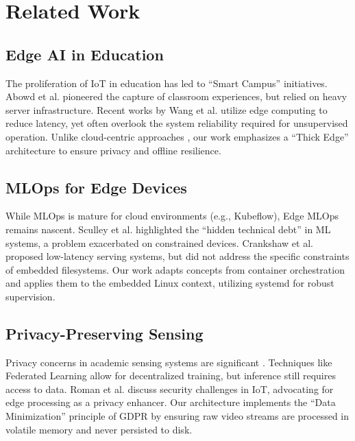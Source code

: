 \documentclass[conference]{IEEEtran}
\begin{document}
\section{Related Work}

\subsection{Edge AI in Education}
The proliferation of IoT in education has led to ``Smart Campus'' initiatives. Abowd et al. \cite{b23} pioneered the capture of classroom experiences, but relied on heavy server infrastructure. Recent works by Wang et al. \cite{b4} utilize edge computing to reduce latency, yet often overlook the system reliability required for unsupervised operation. Unlike cloud-centric approaches \cite{b24}, our work emphasizes a ``Thick Edge'' architecture to ensure privacy and offline resilience.

\subsection{MLOps for Edge Devices}
While MLOps is mature for cloud environments (e.g., Kubeflow), Edge MLOps remains nascent. Sculley et al. \cite{b11} highlighted the ``hidden technical debt'' in ML systems, a problem exacerbated on constrained devices. Crankshaw et al. \cite{b1} proposed low-latency serving systems, but did not address the specific constraints of embedded filesystems. Our work adapts concepts from container orchestration \cite{b5} and applies them to the embedded Linux context, utilizing systemd \cite{b3} for robust supervision.

\subsection{Privacy-Preserving Sensing}
Privacy concerns in academic sensing systems are significant \cite{b21}. Techniques like Federated Learning \cite{b26} allow for decentralized training, but inference still requires access to data. Roman et al. \cite{b21} discuss security challenges in IoT, advocating for edge processing as a privacy enhancer. Our architecture implements the ``Data Minimization'' principle of GDPR \cite{b9} by ensuring raw video streams are processed in volatile memory and never persisted to disk.

\end{document}
